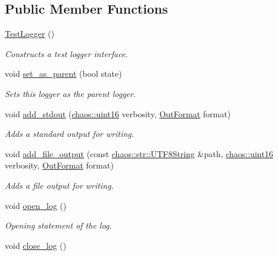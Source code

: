 \subsection*{Public Member Functions}
\begin{DoxyCompactItemize}
\item 
\hyperlink{classchaos_1_1test_1_1_test_logger_a59b5462eea92053f301b8c5e9c61892f}{Test\-Logger} ()
\begin{DoxyCompactList}\small\item\em Constructs a test logger interface. \end{DoxyCompactList}\item 
void \hyperlink{classchaos_1_1test_1_1_test_logger_a95a0c9aa1345a94f84e41caa71e6e8ab}{set\-\_\-as\-\_\-parent} (bool state)
\begin{DoxyCompactList}\small\item\em Sets this logger as the parent logger. \end{DoxyCompactList}\item 
void \hyperlink{classchaos_1_1test_1_1_test_logger_a456e2ef7ebdf42835e9bf2add7b75696}{add\-\_\-stdout} (\hyperlink{namespacechaos_ac3888b1c9e56da7fbbdb3ab8425b4068}{chaos\-::uint16} verbosity, \hyperlink{classchaos_1_1test_1_1_test_logger_a8e6f679501d623e41ac0f0c445a7820d}{Out\-Format} format)
\begin{DoxyCompactList}\small\item\em Adds a standard output for writing. \end{DoxyCompactList}\item 
void \hyperlink{classchaos_1_1test_1_1_test_logger_a1fbb472096b242fb5c18cd4563d37fab}{add\-\_\-file\-\_\-output} (const \hyperlink{classchaos_1_1str_1_1_u_t_f8_string}{chaos\-::str\-::\-U\-T\-F8\-String} \&path, \hyperlink{namespacechaos_ac3888b1c9e56da7fbbdb3ab8425b4068}{chaos\-::uint16} verbosity, \hyperlink{classchaos_1_1test_1_1_test_logger_a8e6f679501d623e41ac0f0c445a7820d}{Out\-Format} format)
\begin{DoxyCompactList}\small\item\em Adds a file output for writing. \end{DoxyCompactList}\item 
\hypertarget{classchaos_1_1test_1_1_test_logger_a81eb3642eda4f8b3a4efa98d78b40592}{void \hyperlink{classchaos_1_1test_1_1_test_logger_a81eb3642eda4f8b3a4efa98d78b40592}{open\-\_\-log} ()}\label{classchaos_1_1test_1_1_test_logger_a81eb3642eda4f8b3a4efa98d78b40592}

\begin{DoxyCompactList}\small\item\em Opening statement of the log. \end{DoxyCompactList}\item 
\hypertarget{classchaos_1_1test_1_1_test_logger_a3ba359890fa3daa7257657e6b3db4d90}{void \hyperlink{classchaos_1_1test_1_1_test_logger_a3ba359890fa3daa7257657e6b3db4d90}{close\-\_\-log} ()}\label{classchaos_1_1test_1_1_test_logger_a3ba359890fa3daa7257657e6b3db4d90}


\end{DoxyCompactItemize}
